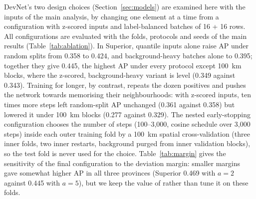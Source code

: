 \documentclass[pdflatex,sn-apa]{sn-jnl}
\begin{document}
\begin{appendices}
DevNet's two design choices (Section~\ref{sec:models}) are examined here with the inputs of the main analysis, by changing one element at a time from a configuration with z-scored inputs and label-balanced batches of 16 + 16 rows. All configurations are evaluated with the folds, protocols and seeds of the main results (Table~\ref{tab:ablation}). In Superior, quantile inputs alone raise AP under random splits from 0.358 to 0.424, and background-heavy batches alone to 0.395; together they give 0.445, the highest AP under every protocol except 100~km blocks, where the z-scored, background-heavy variant is level (0.349 against 0.343). Training for longer, by contrast, repeats the dozen positives and pushes the network towards memorising their neighbourhoods: with z-scored inputs, ten times more steps left random-split AP unchanged (0.361 against 0.358) but lowered it under 100~km blocks (0.277 against 0.329). The nested early-stopping configuration chooses the number of steps (100--3,000, cosine schedule over 3,000 steps) inside each outer training fold by a 100~km spatial cross-validation (three inner folds, two inner restarts, background purged from inner validation blocks), so the test fold is never used for the choice. Table~\ref{tab:margin} gives the sensitivity of the final configuration to the deviation margin: smaller margins gave somewhat higher AP in all three provinces (Superior 0.469 with $a = 2$ against 0.445 with $a = 5$), but we keep the value of \citet{Pang2019} rather than tune it on these folds.


\end{appendices}
\end{document}
